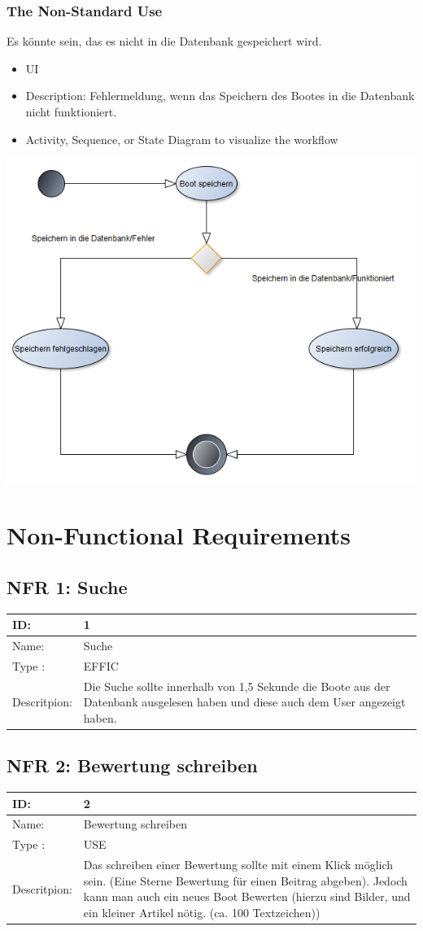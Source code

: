 \documentclass[12pt]{article}
\theoremstyle{definition}
\begin{document}
\subsubsection{The Non-Standard Use}
Es könnte sein, das es nicht in die Datenbank gespeichert wird.
\begin{itemize}
	\item UI
	\item Description: Fehlermeldung, wenn das Speichern des Bootes in die Datenbank nicht funktioniert.
	\item Activity, Sequence, or State Diagram to visualize the workflow
\end{itemize}
\includegraphics[height=0.40\textwidth]{Boot_anlegen_Fehler.PNG}
\pagebreak

\section{Non-Functional Requirements}

\subsection{NFR 1: Suche}
\begin{tabular}{|p{.2\linewidth}|p{.65\linewidth}|}
\hline 
ID: & 1 \\ \hline
Name: & Suche \\ \hline
Type	: & EFFIC \\ \hline
Descritpion: &  Die Suche sollte innerhalb von 1,5 Sekunde die Boote aus der Datenbank ausgelesen haben und diese auch dem User angezeigt haben.\\ \hline
\end{tabular}

\subsection{NFR 2: Bewertung schreiben}
\begin{tabular}{|p{.2\linewidth}|p{.65\linewidth}|}
\hline 
ID: & 2 \\ \hline
Name: & Bewertung schreiben \\ \hline
Type	: & USE \\ \hline
Descritpion: &  Das schreiben einer Bewertung sollte mit einem Klick möglich sein. (Eine Sterne Bewertung für einen Beitrag abgeben). Jedoch kann man auch ein neues Boot Bewerten (hierzu sind Bilder, und ein kleiner Artikel nötig. (ca. 100 Textzeichen))\\ \hline
\end{tabular}
\end{document}

